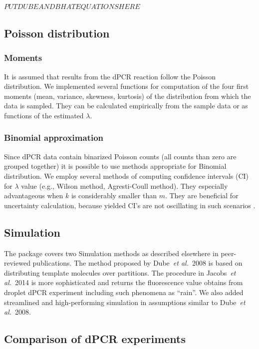 \documentclass[a4,center,fleqn]{NAR}
\begin{document}
$PUTDUBEANDBHATEQUATIONSHERE$

\subsection{Poisson distribution}


\subsubsection{Moments}
It is assumed that results from the dPCR reaction follow the Poisson 
distribution. We implemented several functions for computation of the four first 
moments (mean, variance, skewness, kurtosis) of the distribution from which the 
data is sampled. They can be calculated empirically from the sample data or as 
functions of the estimated $\lambda$.

\subsubsection{Binomial approximation}
Since dPCR data contain binarized Poisson 
counts (all counts than zero are grouped together) it is possible to use methods 
appropriate for Binomial distribution. We employ several methods of computing 
confidence intervals (CI) for $\lambda$ value (e.g., Wilson method, 
Agresti-Coull method). They especially advantageous when $k$ is considerably 
smaller than $m$. They are beneficial for uncertainty calculation, because 
yielded CI's are not oscillating in such scenarios \cite{brown_2001}.

\subsection{Simulation}

The package covers two Simulation methods as described elsewhere in 
peer-reviewed publications. The method proposed by Dube~\textit{et al.}~2008 
\cite{dube_mathematical_2008} is based on distributing template molecules over 
partitions. The procedure in Jacobs~\textit{et al.}~2014 \cite{jacobs_2014} is 
more sophisticated and returns the fluorescence value obtains from droplet dPCR 
experiment including such phenomena as ``rain''. We also added streamlined and 
high-performing simulation in assumptions similar to Dube~\textit{et al.}~2008.

\subsection{Comparison of dPCR experiments}
\end{document}
